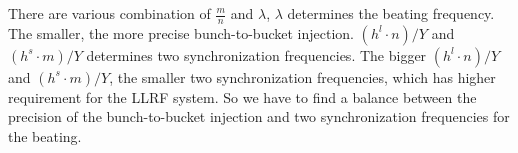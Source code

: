 There are various combination of $\frac{m}{n}$ and $\lambda$, $\lambda$ determines the beating frequency. The smaller, the more precise bunch-to-bucket injection. $(h^l\cdot n)/Y$ and $(h^s\cdot m)/Y$ determines two synchronization frequencies. The bigger $(h^l\cdot n)/Y$ and $(h^s\cdot m)/Y$, the smaller two synchronization frequencies, which has higher requirement for the LLRF system. So we have to find a balance between the precision of the bunch-to-bucket injection and two synchronization frequencies for the beating.



%
%
